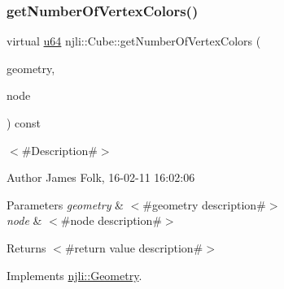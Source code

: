 \mbox{\label{classnjli_1_1_cube_ad0a716c391963e9e64e26900b8e152a4}} 
\subsubsection{\texorpdfstring{get\+Number\+Of\+Vertex\+Colors()}{getNumberOfVertexColors()}}
{\footnotesize\ttfamily virtual \mbox{\hyperlink{_util_8h_ad758b7a5c3f18ed79d2fcd23d9f16357}{u64}} njli\+::\+Cube\+::get\+Number\+Of\+Vertex\+Colors (\begin{DoxyParamCaption}\item[{\mbox{\hyperlink{classnjli_1_1_level_of_detail}{Level\+Of\+Detail}} $\ast$}]{geometry,  }\item[{\mbox{\hyperlink{classnjli_1_1_node}{Node}} $\ast$}]{node }\end{DoxyParamCaption}) const\hspace{0.3cm}{\ttfamily [virtual]}}



$<$\#\+Description\#$>$ 

\begin{DoxyAuthor}{Author}
James Folk, 16-\/02-\/11 16\+:02\+:06
\end{DoxyAuthor}

\begin{DoxyParams}{Parameters}
{\em geometry} & $<$\#geometry description\#$>$ \\
\hline
{\em node} & $<$\#node description\#$>$\\
\hline
\end{DoxyParams}
\begin{DoxyReturn}{Returns}
$<$\#return value description\#$>$ 
\end{DoxyReturn}


Implements \mbox{\hyperlink{classnjli_1_1_geometry_a224b18abc15b88b556e6b71bb89ecf73}{njli\+::\+Geometry}}.

\mbox{\label{classnjli_1_1_cube_a62a69318d5cb98a56f81f91968efcc8e}} 

